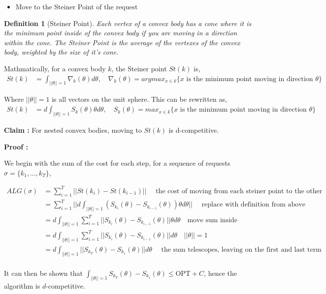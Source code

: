 \documentclass[11pt]{article}
\newtheorem{definition}[fact]{Definition}
\newcommand{\OPT}{\text{OPT}}
\begin{document}
\begin{itemize}
		\item Move to the Steiner Point of the request
\end{itemize}

\begin{definition}[Steiner Point]
	Each vertex of a convex body has a cone where it is the minimum point inside of the convex body if you are moving 
	in a direction within the cone. The Steiner Point is the average of the vertexes of the convex body, weighted by the size 
	of it's cone. 
\end{definition}


Mathmatically, for a convex body $k$, the Steiner point $St(k)$ is,
\begin{align*}
	St(k) &= \int_{||\theta|| = 1} \nabla_k(\theta) d\theta, \quad \nabla_k(\theta) = argmax_{x \in k}\{x \text{ is the minimum point moving in direction } \theta\}
\end{align*}

Where $|| \theta|| = 1$ is all vectors on the unit sphere. This can be rewritten as, 
\begin{align*}
	St(k) &= d \int_{||\theta|| = 1} S_k(\theta) \theta d\theta, \quad S_k(\theta) = max_{x \in k}\{x \text{ is the minimum point moving in direction } \theta\}
\end{align*}


\textbf{Claim :} For nested convex bodies, moving to $St(k)$ is d-competitive.

\textbf{Proof :} 

We begin with the sum of the cost for each step, for a sequence of requests $\sigma = \{k_1, ..., k_T\}$,

\begin{align*}
	ALG(\sigma) &= \sum_{i=1}^T ||St(k_i) - St(k_{i-1})|| \quad \text{ the cost of moving from each steiner point to the other}\\
		&= \sum_{i=1}^T ||d \int_{||\theta|| = 1} (S_{k_i}(\theta) - S_{k_{i-1}}(\theta)) \theta d\theta || \quad \text{ replace with definition from above}\\
		&= d   \int_{||\theta|| = 1}\sum_{i=1}^T ||S_{k_i}(\theta) - S_{k_{i-1}}(\theta)  ||\theta d\theta \quad \text{move sum inside}\\
		&= d   \int_{||\theta|| = 1}\sum_{i=1}^T ||S_{k_i}(\theta) - S_{k_{i-1}}(\theta) || d\theta\quad ||\theta|| = 1\\
		&= d   \int_{||\theta|| = 1}||S_{k_T}(\theta) - S_{k_{1}}(\theta) || d\theta\quad \text{ the sum telescopes, leaving on the first and last term} \\ 
\end{align*}

It can then be shown that $\int_{||\theta|| = 1} S_{k_T}(\theta) - S_{k_{1}}(\theta) \leq \OPT + C$, hence the algorithm is $d$-competitive.
\end{document}

